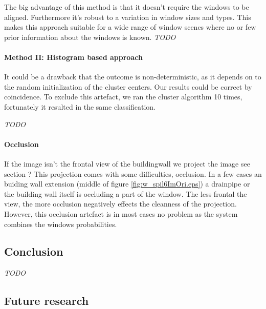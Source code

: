 The big advantage of this method is that it doesn't require the windows to be aligned.
Furthermore it's robust to a variation in window sizes and types. This makes
this approach suitable for a wide range of window scenes where no or few prior
information about the windows is known.
\emph{TODO}


\paragraph{Method II: Histogram based approach} 



It could be a drawback that the outcome is non-deterministic, as it depends on to the
random initialization of the cluster centers. Our results could be correct by
coincidence.  To exclude this artefact, we ran the cluster algorithm 10 times,
fortunately it resulted in the same classification.


\emph{TODO}\\

\paragraph{Occlusion}
\label{lab:occlusion}
If the image isn't the frontal view of the buildingwall we project the image 
see section ?%
This projection comes with some difficulties, occlusion.  In a few cases an
buiding wall extension (middle of figure \ref{fig:w_spil6ImOri.eps}) a drainpipe
or the building wall itself is occluding a part of the window.  The less frontal
the view, the more occlusion negatively effects the cleanness of the projection.
However, this occlusion artefact is in most cases no problem as the system
combines the windows probabilities.  

\subsection{Conclusion}
\emph{TODO}

\subsection{Future research}
